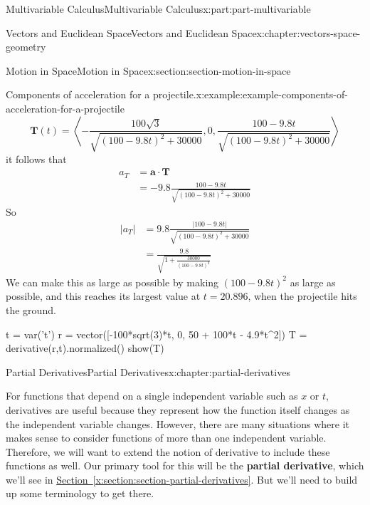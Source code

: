 \documentclass[twoside,10pt,]{tufte-book}
\newcommand{\xreffont}{\relax}
\newcommand{\terminology}[1]{\textbf{#1}}
\numberwithin{equation}{part}
\newcommand{\dotprod}[1]{\left\langle #1 \right\rangle}
\begin{document}
\begin{partptx}{Multivariable Calculus}{}{Multivariable Calculus}{}{}{x:part:part-multivariable}
\begin{chapterptx}{Vectors and Euclidean Space}{}{Vectors and Euclidean Space}{}{}{x:chapter:vectors-space-geometry}
\begin{sectionptx}{Motion in Space}{}{Motion in Space}{}{}{x:section:section-motion-in-space}
\begin{example}{Components of acceleration for a projectile.}{x:example:example-components-of-acceleration-for-a-projectile}
%
\begin{equation*}
\mathbf{T}(t) = \dotprod{-\frac{100\sqrt{3}}{\sqrt{(100-9.8t)^{2}+30000}}, 0, \frac{100 - 9.8t}{\sqrt{(100-9.8t)^{2}+30000}}}
\end{equation*}
it follows that%
%
\begin{align*}
a_{T} & = \mathbf{a}\cdot\mathbf{T} \\
& =  -9.8\frac{100 - 9.8t}{\sqrt{(100-9.8t)^{2}+30000}}
\end{align*}
So%
%
\begin{align*}
|a_{T}| & = 9.8\frac{|100 - 9.8t|}{\sqrt{(100-9.8t)^{2}+30000}} \\
& = \frac{9.8}{\sqrt{1+\frac{30000}{(100-9.8t)^{2}}}} 
\end{align*}
We can make this as large as possible by making \((100-9.8t)^{2}\) as large as possible, and this reaches its largest value at \(t = 20.896\), when the projectile hits the ground.%
\end{example}
\begin{sageinput}
t = var('t')
r = vector([-100*sqrt(3)*t, 0, 50 + 100*t - 4.9*t^2])
T = derivative(r,t).normalized()
show(T)
\end{sageinput}
\end{sectionptx}
\end{chapterptx}
%
\typeout{************************************************}
\typeout{************************************************}
%
\begin{chapterptx}{Partial Derivatives}{}{Partial Derivatives}{}{}{x:chapter:partial-derivatives}
\begin{introduction}{}%
For functions that depend on a single independent variable such as \(x\) or \(t\), derivatives are useful because they represent how the function itself changes as the independent variable changes. However, there are many situations where it makes sense to consider functions of more than one independent variable. Therefore, we will want to extend the notion of derivative to include these functions as well. Our primary tool for this will be the \terminology{partial derivative}, which we'll see in \hyperref[x:section:section-partial-derivatives]{Section~{\xreffont\ref{x:section:section-partial-derivatives}}}. But we'll need to build up some terminology to get there.%
\end{introduction}%
%
%
\typeout{************************************************}
\typeout{************************************************}

\end{chapterptx}
\end{partptx}
\end{document}
